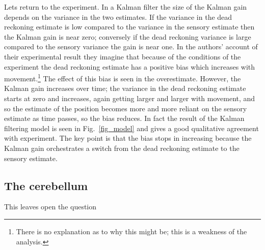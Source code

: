 \documentclass[12pt]{article}
\begin{document}
Lets return to the experiment. In a Kalman filter the size of the
Kalman gain depends on the variance in the two estimates. If the
variance in the dead reckoning estimate is low compared to the
variance in the sensory estimate then the Kalman gain is near zero;
conversely if the dead reckoning variance is large compared to the
sensory variance the gain is near one. In the authors' account of
their experimental result they imagine that because of the conditions
of the experiment the dead reckoning estimate has a positive bias
which increases with movement.\footnote{There is no explanation as to
  why this might be; this is a weakness of the analysis.} The effect
of this bias is seen in the overestimate. However, the Kalman gain
increases over time; the variance in the dead reckoning estimate
starts at zero and increases, again getting larger and larger with
movement, and so the estimate of the position becomes more and more
reliant on the sensory estimate as time passes, so the bias
reduces. In fact the result of the Kalman filtering model is seen in
Fig.~\ref{fig_model} and gives a good qualitative agreement with
experiment. The key point is that the bias stops in increasing because
the Kalman gain orchestrates a switch from the dead reckoning estimate
to the sensory estimate.

\subsection*{The cerebellum}

This leaves open the question

 {}
\end{document}

